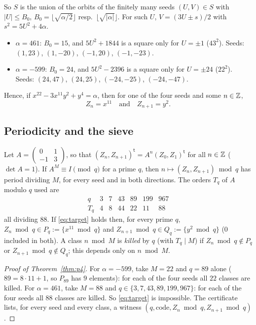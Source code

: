 So $S$ is the union of the orbits of the finitely many seeds $(U,V)\in S$ with $|U|\le B_0$, $B_0=\lfloor\sqrt{\alpha/2}\rfloor$ resp.\ $\lfloor\sqrt{|\alpha|}\rfloor$. For such $U$, $V=(3U\pm s)/2$ with $s^2=5U^2+4\alpha$.
\begin{itemize}
\item $\alpha=461$: $B_0=15$, and $5U^2+1844$ is a square only for $U=\pm1$ ($43^2$). Seeds: $(1,23)$, $(1,-20)$, $(-1,20)$, $(-1,-23)$.
\item $\alpha=-599$: $B_0=24$, and $5U^2-2396$ is a square only for $U=\pm24$ ($22^2$). Seeds: $(24,47)$, $(24,25)$, $(-24,-25)$, $(-24,-47)$.
\end{itemize}
Hence, if $x^{22}-3x^{11}y^2+y^4=\alpha$, then for one of the four seeds and some $n\in\mathbb Z$,
\begin{equation}\label{eq:target}
Z_n=x^{11}\quad\text{and}\quad Z_{n+1}=y^2.
\end{equation}

\subsection{Periodicity and the sieve}
Let $A=\begin{pmatrix}0&1\\-1&3\end{pmatrix}$, so that $(Z_n,Z_{n+1})^{\mathsf t}=A^n(Z_0,Z_1)^{\mathsf t}$ for all $n\in\mathbb Z$ ($\det A=1$). If $A^M\equiv I\pmod q$ for a prime $q$, then $n\mapsto(Z_n,Z_{n+1})\bmod q$ has period dividing $M$, for every seed and in both directions. The orders $T_q$ of $A$ modulo $q$ used are
\[
\begin{array}{c|cccccc}
q&3&7&43&89&199&967\\\hline T_q&4&8&44&22&11&88
\end{array}
\]
all dividing $88$. If \eqref{eq:target} holds then, for every prime $q$, $Z_n\bmod q\in P_q:=\{x^{11}\bmod q\}$ and $Z_{n+1}\bmod q\in Q_q:=\{y^2\bmod q\}$ ($0$ included in both). A class $n\bmod M$ is \emph{killed} by $q$ (with $T_q\mid M$) if $Z_n\bmod q\notin P_q$ or $Z_{n+1}\bmod q\notin Q_q$; this depends only on $n\bmod M$.

\begin{proof}[Proof of Theorem~\ref{thm:p4}]
For $\alpha=-599$, take $M=22$ and $q=89$ alone ($89=8\cdot11+1$, so $P_{89}$ has $9$ elements): for each of the four seeds all $22$ classes are killed. For $\alpha=461$, take $M=88$ and $q\in\{3,7,43,89,199,967\}$: for each of the four seeds all $88$ classes are killed. So \eqref{eq:target} is impossible. The certificate  lists, for every seed and every class, a witness $(q,\text{code},Z_n\bmod q,Z_{n+1}\bmod q)$.
\end{proof}

